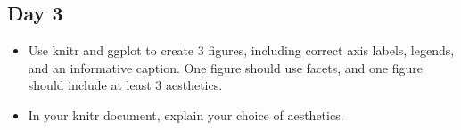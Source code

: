 \documentclass[english, letterpaper, 12pt]{article}
\begin{document}
\subsection*{Day 3}
\begin{itemize}
    \item Use knitr and ggplot to create 3 figures, including correct axis
labels, legends, and an informative caption.  One figure should
use facets, and one figure should include at least 3 aesthetics.  
    \item In your knitr document, explain your choice of aesthetics.
\end{itemize}
\end{document}
